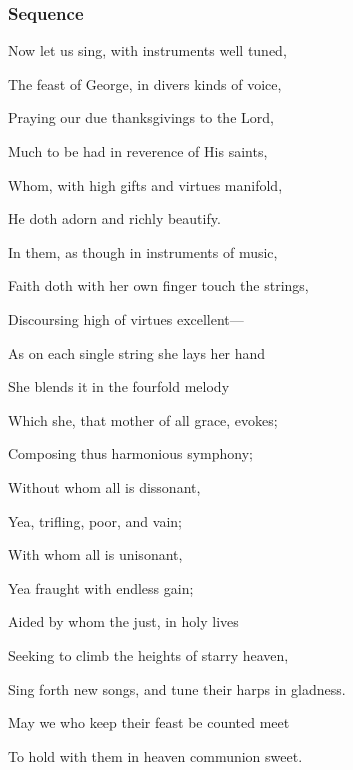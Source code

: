 \subsubsection{Sequence}
\begin{multicols}{2}
\begin{hangparas}{1.25em}{1}

Now let us sing, with instruments well tuned,

The feast of George, in divers kinds of voice,

Praying our due thanksgivings to the Lord,

Much to be had in reverence of His saints,

Whom, with high gifts and virtues manifold,

He doth adorn and richly beautify.

In them, as though in instruments of music,

Faith doth with her own finger touch the strings,

Discoursing high of virtues excellent---

As on each single string she lays her hand

She blends it in the fourfold melody

Which she, that mother of all grace, evokes;

Composing thus harmonious symphony;

Without whom all is dissonant,

Yea, trifling, poor, and vain;

With whom all is unisonant,

Yea fraught with endless gain;

Aided by whom the just, in holy lives

Seeking to climb the heights of starry heaven,

Sing forth new songs, and tune their harps in gladness.

May we who keep their feast be counted meet

To hold with them in heaven communion sweet.
\end{hangparas}
\end{multicols}


